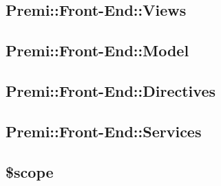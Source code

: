		\subsection{Premi::Front-End::Views}
			
			\newpage

		\subsection{Premi::Front-End::Model}
			
			\newpage

		\subsection{Premi::Front-End::Directives}
			
			\newpage

		\subsection{Premi::Front-End::Services}
			
			\newpage
		
		\subsection{\$scope}
			
			\newpage
